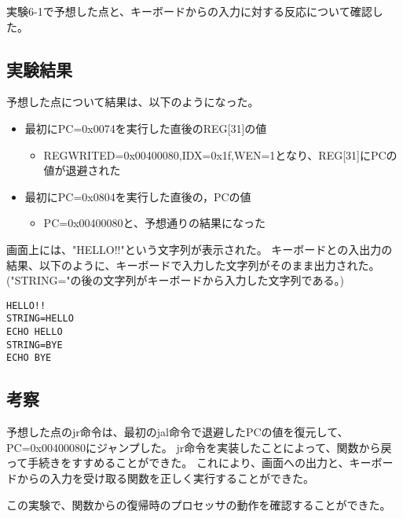 実験6-1で予想した点と、キーボードからの入力に対する反応について確認した。

\subsection{実験結果}
予想した点について結果は、以下のようになった。
\begin{itemize}
  \item 最初にPC=0x0074を実行した直後のREG[31]の値
        \begin{itemize}
          \item REGWRITED=0x00400080,IDX=0x1f,WEN=1となり、REG[31]にPCの値が退避された
        \end{itemize}
  \item 最初にPC=0x0804を実行した直後の，PCの値
        \begin{itemize}
          \item PC=0x00400080と、予想通りの結果になった
        \end{itemize}
\end{itemize}

画面上には、"HELLO!!"という文字列が表示された。
キーボードとの入出力の結果、以下のように、キーボードで入力した文字列がそのまま出力された。
("STRING="の後の文字列がキーボードから入力した文字列である。)
\begin{lstlisting}[caption={実行結果},label={実行結果6-2}]
HELLO!!
STRING=HELLO
ECHO HELLO
STRING=BYE
ECHO BYE
\end{lstlisting}

\subsection{考察}
予想した点のjr命令は、最初のjal命令で退避したPCの値を復元して、PC=0x00400080にジャンプした。
jr命令を実装したことによって、関数から戻って手続きをすすめることができた。
これにより、画面への出力と、キーボードからの入力を受け取る関数を正しく実行することができた。

この実験で、関数からの復帰時のプロセッサの動作を確認することができた。
